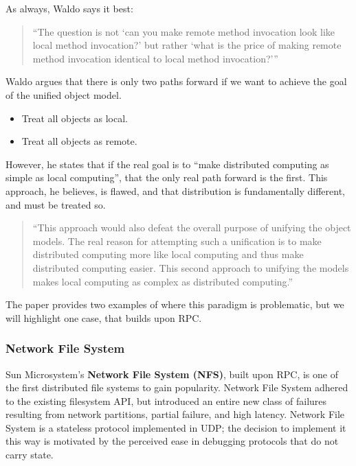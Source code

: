 As always, Waldo says it best:

\begin{quote}
``The question is not `can you make remote method invocation look like local method invocation?' but rather `what is the price of making remote method invocation identical to local method invocation?'''~\cite{kendall1994note}
\end{quote}

Waldo argues that there is only two paths forward if we want to achieve the goal of the unified object model.

\begin{itemize}
\item Treat all objects as local.
\item Treat all objects as remote.
\end{itemize}

However, he states that if the real goal is to ``make distributed computing as simple as local computing'', that the only real path forward is the first.  This approach, he believes, is flawed, and that distribution is fundamentally different, and must be treated so.

\begin{quote}
``This approach would also defeat the overall purpose of unifying
the object models. The real reason for attempting such a
unification is to make distributed computing more like local
computing and thus make distributed computing easier. This
second approach to unifying the models makes local computing
as complex as distributed computing.''~\cite{kendall1994note}	
\end{quote}

The paper provides two examples of where this paradigm is problematic, but we will highlight one case, that builds upon RPC.

\subsubsection{Network File System}

Sun Microsystem's \textbf{Network File System (NFS)}, built upon RPC, is one of the first distributed file systems to gain popularity.  Network File System adhered to the existing filesystem API, but introduced an entire new class of failures resulting from network partitions, partial failure, and high latency.  Network File System is a stateless protocol implemented in UDP; the decision to implement it this way is motivated by the perceived ease in debugging protocols that do not carry state.

